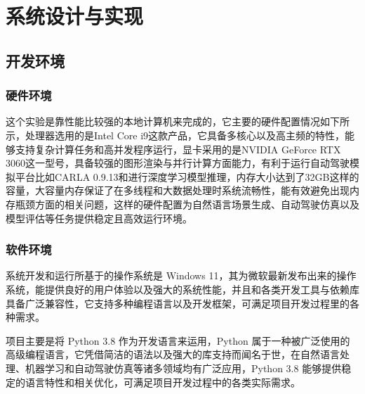 \chapter{系统设计与实现}
\section{开发环境}
\subsection{硬件环境}
这个实验是靠性能比较强的本地计算机来完成的，它主要的硬件配置情况如下所示，处理器选用的是Intel Core i9这款产品，它具备多核心以及高主频的特性，能够支持复杂计算任务和高并发程序运行，显卡采用的是NVIDIA GeForce RTX 3060这一型号，具备较强的图形渲染与并行计算方面能力，有利于运行自动驾驶模拟平台比如CARLA 0.9.13和进行深度学习模型推理，内存大小达到了32GB这样的容量，大容量内存保证了在多线程和大数据处理时系统流畅性，能有效避免出现内存瓶颈方面的相关问题，这样的硬件配置为自然语言场景生成、自动驾驶仿真以及模型评估等任务提供稳定且高效运行环境。
\subsection{软件环境}
系统开发和运行所基于的操作系统是 Windows 11，其为微软最新发布出来的操作系统，能提供良好的用户体验以及强大的系统性能，并且和各类开发工具与依赖库具备广泛兼容性，它支持多种编程语言以及开发框架，可满足项目开发过程里的各种需求。

项目主要是将 Python 3.8 作为开发语言来运用，Python 属于一种被广泛使用的高级编程语言，它凭借简洁的语法以及强大的库支持而闻名于世，在自然语言处理、机器学习和自动驾驶仿真等诸多领域均有广泛应用，Python 3.8 能够提供稳定的语言特性和相关优化，可满足项目开发过程中的各类实际需求。

